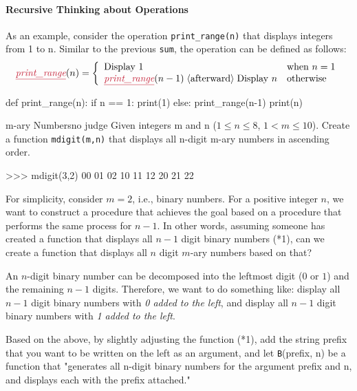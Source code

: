 \medskip

\paragraph{Recursive Thinking about Operations}
As an example, consider the operation \texttt{print\_range(n)} that displays integers from 1 to n. Similar to the previous \texttt{sum}, the operation can be defined as follows:
\[
        \mbox{\cemph{print\_range}}(n) = \left\{
        \begin{array}[c]{ll}
          \text{Display } 1 & \mbox{when $n=1$}\\
          \mbox{\cemph{print\_range}}(n-1) \; \langle\text{afterward}\rangle
          \; \text{Display } n & \mbox{otherwise}
        \end{array}
      \right.
\]

\begin{pybox}[emph={print_range}]
def print_range(n):
  if n == 1:
    print(1)
  else:
    print_range(n-1)
    print(n)
\end{pybox}


\begin{psbox}{m-ary Numbers}{no judge}
  Given integers m and n ($1\le n \le
  8$, $1 < m \le 10$).
  Create a function \texttt{mdigit(m,n)} that displays all n-digit m-ary numbers in ascending order.
\end{psbox}

\begin{terminal}
>>> mdigit(3,2)
00
01
02
10
11
12
20
21
22
\end{terminal}

For simplicity, consider $m=2$, i.e., binary numbers. For a positive integer $n$, we want to construct a procedure that achieves the goal based on a procedure that performs the same process for $n-1$.
In other words, assuming someone has created a function that displays all $n-1$ digit binary numbers (*1), can we create a function that displays all $n$ digit $m$-ary numbers based on that?

An $n$-digit binary number can be decomposed into the leftmost digit ($0$ or $1$) and the remaining $n-1$ digits.
Therefore, we want to do something like: display all $n-1$ digit binary numbers with \emph{0 added to the left}, and display all $n-1$ digit binary numbers with \emph{1 added to the left}.

Based on the above, by slightly adjusting the function (*1), add the string prefix that you want to be written on the left as an argument, and let \texttt{B}(prefix, n) be a function that "generates all n-digit binary numbers for the argument prefix and n, and displays each with the prefix attached."

